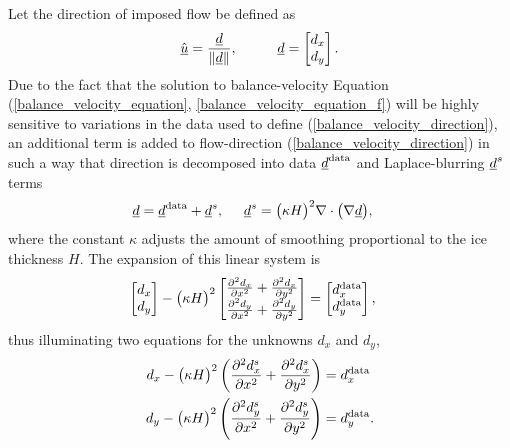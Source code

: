 Let the direction of imposed flow be defined as
\begin{align}
  \label{balance_velocity_direction}
  \hat{\rankone{u}} = \frac{\rankone{d}}{\Vert \rankone{d} \Vert}, \hspace{10mm} 
  \rankone{d} = \begin{bmatrix}
                 d_x \\
                 d_y \\
               \end{bmatrix}.
\end{align}
Due to the fact that the solution to balance-velocity Equation (\ref{balance_velocity_equation}, \ref{balance_velocity_equation_f}) will be highly sensitive to variations in the data used to define (\ref{balance_velocity_direction}), an additional term is added to flow-direction (\ref{balance_velocity_direction}) in such a way that direction is decomposed into data $\rankone{d}^{\text{data}}$ and Laplace-blurring $\rankone{d}^s$ terms \citep{brinkerhoff_2015}
\begin{align*}
  \rankone{d} &= \rankone{d}^{\text{data}} + \rankone{d}^s, \hspace{5mm} \rankone{d}^s = \big( \kappa H \big)^2 \nabla \cdot \big( \nabla \rankone{d} \big),
\end{align*}
where the constant $\kappa$ adjusts the amount of smoothing proportional to the ice thickness $H$.  The expansion of this linear system is
\begin{align*}
  \begin{bmatrix}
    d_x \\
    d_y
  \end{bmatrix} - \big( \kappa H \big)^2
  \begin{bmatrix}
    \parder[2]{d_x}{x} + \parder[2]{d_x}{y} \\ 
    \parder[2]{d_y}{x} + \parder[2]{d_y}{y}
  \end{bmatrix} &=
  \begin{bmatrix}
     d_x^{\text{data}} \\
     d_y^{\text{data}}
  \end{bmatrix},
\end{align*}
thus illuminating two equations for the unknowns $d_x$ and $d_y$,
\begin{align}
  \label{smoothed_driving_stress_x}
  d_x - \big( \kappa H \big)^2 \left( \parder[2]{d_x^s}{x} + \parder[2]{d_x^s}{y} \right) &= d_x^{\text{data}} \\
  \label{smoothed_driving_stress_y}
  d_y - \big( \kappa H \big)^2 \left( \parder[2]{d_y^s}{x} + \parder[2]{d_y^s}{y} \right) &= d_y^{\text{data}}.
\end{align}

